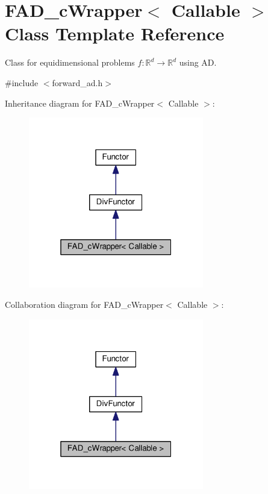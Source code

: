 \hypertarget{classFAD__cWrapper}{}\section{F\+A\+D\+\_\+c\+Wrapper$<$ Callable $>$ Class Template Reference}
\label{classFAD__cWrapper}


Class for equidimensional problems $f:\mathbb{R}^d \rightarrow \mathbb{R}^d$ using AD.  




{\ttfamily \#include $<$forward\+\_\+ad.\+h$>$}



Inheritance diagram for F\+A\+D\+\_\+c\+Wrapper$<$ Callable $>$\+:\nopagebreak
\begin{figure}[H]
\begin{center}
\leavevmode
\includegraphics[width=217pt]{classFAD__cWrapper__inherit__graph}
\end{center}
\end{figure}


Collaboration diagram for F\+A\+D\+\_\+c\+Wrapper$<$ Callable $>$\+:\nopagebreak
\begin{figure}[H]
\begin{center}
\leavevmode
\includegraphics[width=217pt]{classFAD__cWrapper__coll__graph}
\end{center}
\end{figure}
